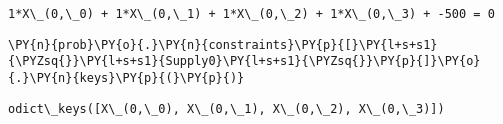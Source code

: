             \begin{tcolorbox}[breakable, size=fbox, boxrule=.5pt, pad at break*=1mm, opacityfill=0]
\begin{Verbatim}[commandchars=\\\{\}]
1*X\_(0,\_0) + 1*X\_(0,\_1) + 1*X\_(0,\_2) + 1*X\_(0,\_3) + -500 = 0
\end{Verbatim}
\end{tcolorbox}
        
    \begin{tcolorbox}[breakable, size=fbox, boxrule=1pt, pad at break*=1mm,colback=cellbackground, colframe=cellborder]
\begin{Verbatim}[commandchars=\\\{\}]
\PY{n}{prob}\PY{o}{.}\PY{n}{constraints}\PY{p}{[}\PY{l+s+s1}{\PYZsq{}}\PY{l+s+s1}{Supply0}\PY{l+s+s1}{\PYZsq{}}\PY{p}{]}\PY{o}{.}\PY{n}{keys}\PY{p}{(}\PY{p}{)}
\end{Verbatim}
\end{tcolorbox}

            \begin{tcolorbox}[breakable, size=fbox, boxrule=.5pt, pad at break*=1mm, opacityfill=0]
\begin{Verbatim}[commandchars=\\\{\}]
odict\_keys([X\_(0,\_0), X\_(0,\_1), X\_(0,\_2), X\_(0,\_3)])
\end{Verbatim}
\end{tcolorbox}
       

